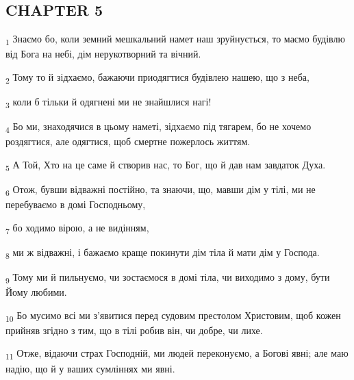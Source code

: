 \subsection{CHAPTER 5}
\begin{tcolorbox}
\textsubscript{1} Знаємо бо, коли земний мешкальний намет наш зруйнується, то маємо будівлю від Бога на небі, дім нерукотворний та вічний.
\end{tcolorbox}
\begin{tcolorbox}
\textsubscript{2} Тому то й зідхаємо, бажаючи приодягтися будівлею нашею, що з неба,
\end{tcolorbox}
\begin{tcolorbox}
\textsubscript{3} коли б тільки й одягнені ми не знайшлися нагі!
\end{tcolorbox}
\begin{tcolorbox}
\textsubscript{4} Бо ми, знаходячися в цьому наметі, зідхаємо під тягарем, бо не хочемо роздягтися, але одягтися, щоб смертне пожерлось життям.
\end{tcolorbox}
\begin{tcolorbox}
\textsubscript{5} А Той, Хто на це саме й створив нас, то Бог, що й дав нам завдаток Духа.
\end{tcolorbox}
\begin{tcolorbox}
\textsubscript{6} Отож, бувши відважні постійно, та знаючи, що, мавши дім у тілі, ми не перебуваємо в домі Господньому,
\end{tcolorbox}
\begin{tcolorbox}
\textsubscript{7} бо ходимо вірою, а не видінням,
\end{tcolorbox}
\begin{tcolorbox}
\textsubscript{8} ми ж відважні, і бажаємо краще покинути дім тіла й мати дім у Господа.
\end{tcolorbox}
\begin{tcolorbox}
\textsubscript{9} Тому ми й пильнуємо, чи зостаємося в домі тіла, чи виходимо з дому, бути Йому любими.
\end{tcolorbox}
\begin{tcolorbox}
\textsubscript{10} Бо мусимо всі ми з'явитися перед судовим престолом Христовим, щоб кожен прийняв згідно з тим, що в тілі робив він, чи добре, чи лихе.
\end{tcolorbox}
\begin{tcolorbox}
\textsubscript{11} Отже, відаючи страх Господній, ми людей переконуємо, а Богові явні; але маю надію, що й у ваших сумліннях ми явні.
\end{tcolorbox}
